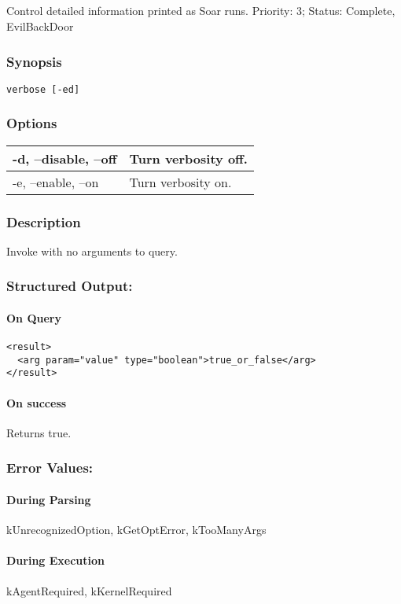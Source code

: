\subsection{}
\label{verbose}
Control detailed information printed as Soar runs. 
 Priority: 3; Status: Complete, EvilBackDoor
\subsubsection*{Synopsis}
\begin{verbatim}
verbose [-ed]
\end{verbatim}
\subsubsection*{Options}
\begin{tabular}{|l|l|}
\hline 
 -d, --disable, --off  & Turn verbosity off.  \\
 \hline 
 -e, --enable, --on  & Turn verbosity on.  \\
 \hline 
\end{tabular}
\subsubsection*{Description}
 Invoke with no arguments to query. 
\subsubsection*{Structured Output:}
\paragraph*{On Query}
\begin{verbatim}
<result>
  <arg param="value" type="boolean">true_or_false</arg>
</result>
\end{verbatim}
\paragraph*{On success}
 Returns true. 
\subsubsection*{Error Values:}
\paragraph*{During Parsing}
 kUnrecognizedOption, kGetOptError, kTooManyArgs
\paragraph*{During Execution}
 kAgentRequired, kKernelRequired
